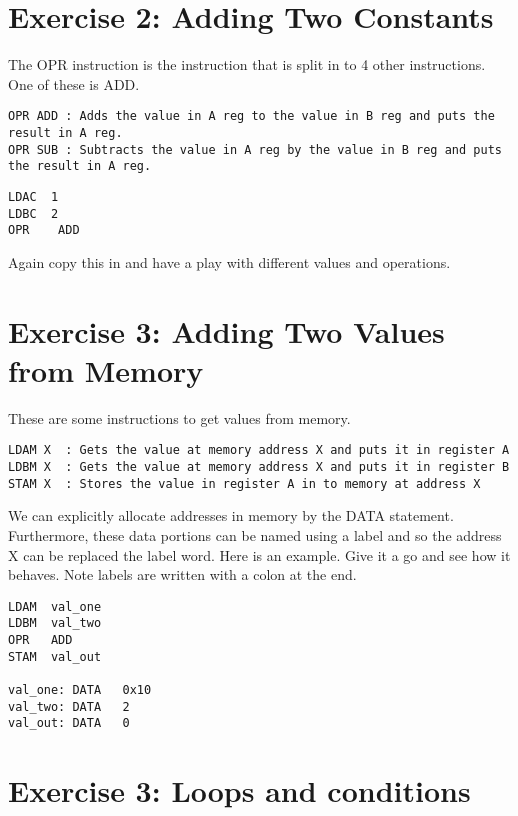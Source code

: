 \documentclass[10pt,a4paper]{article}
\begin{document}
\section{Exercise 2: Adding Two Constants}

The OPR instruction is the instruction that is split in to 4 other instructions. One of these is ADD. 

\begin{verbatim}
OPR ADD	: Adds the value in A reg to the value in B reg and puts the result in A reg.
OPR SUB	: Subtracts the value in A reg by the value in B reg and puts the result in A reg.
\end{verbatim}

\begin{lstlisting}[frame=single]
LDAC  1
LDBC  2
OPR    ADD
\end{lstlisting}

Again copy this in and have a play with different values and operations.

\section{Exercise 3: Adding Two Values from Memory}

These are some instructions to get values from memory.

\begin{verbatim}
LDAM X	: Gets the value at memory address X and puts it in register A
LDBM X	: Gets the value at memory address X and puts it in register B
STAM X	: Stores the value in register A in to memory at address X
\end{verbatim}

We can explicitly allocate addresses in memory by the DATA statement. Furthermore, these data portions can be named using a label and so the address X can be replaced the label word. Here is an example. Give it a go and see how it behaves. Note labels are written with a colon at the end.
\\
\begin{lstlisting}[frame=single]
LDAM  val_one
LDBM  val_two
OPR   ADD
STAM  val_out

val_one: DATA   0x10
val_two: DATA   2
val_out: DATA   0
\end{lstlisting}

\section{Exercise 3: Loops and conditions}
\end{document}
